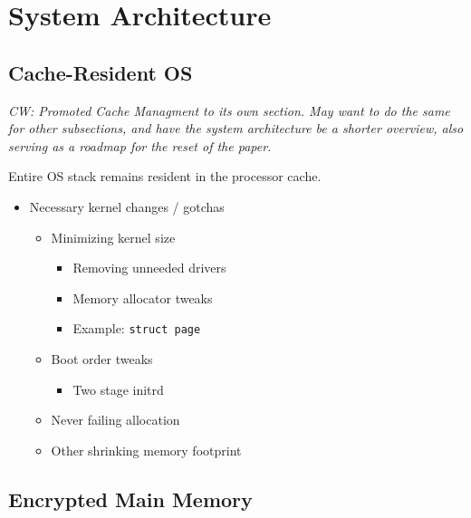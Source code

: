 \section{System Architecture}
\label{sec:architecture}

\subsection{Cache-Resident OS}

{\em CW: Promoted Cache Managment to its own section.
     May want to do the same for other subsections, and
     have the system architecture be a shorter overview,
     also serving as a roadmap for the reset of the paper.}

Entire OS stack remains resident in the processor cache.

\begin{itemize}
  \item Necessary kernel changes / gotchas
    \begin{itemize}
      \item Minimizing kernel size
        \begin{itemize}
          \item Removing unneeded drivers
          \item Memory allocator tweaks
          \item Example: {\tt struct page}
        \end{itemize}

      \item Boot order tweaks
        \begin{itemize}
          \item Two stage initrd
        \end{itemize}

      \item Never failing allocation
      \item Other shrinking memory footprint
    \end{itemize}
\end{itemize}

\subsection{Encrypted Main Memory}

